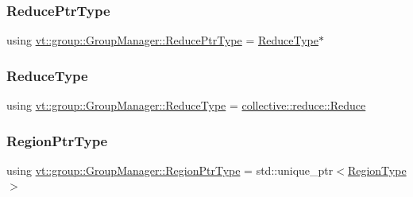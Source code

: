 \mbox{\label{structvt_1_1group_1_1_group_manager_a0c646983506b624ad93ceb127df9e811}} 
\subsubsection{\texorpdfstring{Reduce\+Ptr\+Type}{ReducePtrType}}
{\footnotesize\ttfamily using \hyperlink{structvt_1_1group_1_1_group_manager_a0c646983506b624ad93ceb127df9e811}{vt\+::group\+::\+Group\+Manager\+::\+Reduce\+Ptr\+Type} =  \hyperlink{structvt_1_1group_1_1_group_manager_a28113adbc42622f7cf278fcaed4efefa}{Reduce\+Type}$\ast$}

\mbox{\label{structvt_1_1group_1_1_group_manager_a28113adbc42622f7cf278fcaed4efefa}} 
\subsubsection{\texorpdfstring{Reduce\+Type}{ReduceType}}
{\footnotesize\ttfamily using \hyperlink{structvt_1_1group_1_1_group_manager_a28113adbc42622f7cf278fcaed4efefa}{vt\+::group\+::\+Group\+Manager\+::\+Reduce\+Type} =  \hyperlink{structvt_1_1collective_1_1reduce_1_1_reduce}{collective\+::reduce\+::\+Reduce}}

\mbox{\label{structvt_1_1group_1_1_group_manager_a9192e585fc2f99bfd5a6ff65fc21c40b}} 
\subsubsection{\texorpdfstring{Region\+Ptr\+Type}{RegionPtrType}}
{\footnotesize\ttfamily using \hyperlink{structvt_1_1group_1_1_group_manager_a9192e585fc2f99bfd5a6ff65fc21c40b}{vt\+::group\+::\+Group\+Manager\+::\+Region\+Ptr\+Type} =  std\+::unique\+\_\+ptr$<$\hyperlink{structvt_1_1group_1_1_group_manager_a38876227e6077059a67a5d5e5647d8a3}{Region\+Type}$>$}

